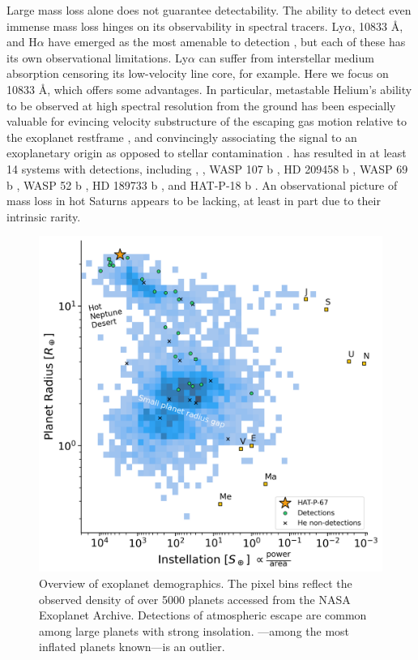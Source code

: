 \documentclass[twocolumn]{aastex631}
\newcommand{\hatpb}{\object{HAT-P-67 b}}
\begin{document}
Large mass loss alone does not guarantee detectability.  The ability to detect even immense mass loss hinges on its observability in spectral tracers.  Ly$\alpha$,  10833 \AA, and H$\alpha$ have emerged as the most amenable to detection \citep{2018ApJ...855L..11O,2022arXiv221116243D,2023MNRAS.518.4357O}, but each of these has its own observational limitations.  Ly$\alpha$ can suffer from interstellar medium  absorption censoring its low-velocity line core, for example.  Here we focus on  10833 \AA, which offers some advantages.  In particular, metastable Helium's ability to be observed at high spectral resolution from the ground has been especially valuable for evincing velocity substructure of the escaping gas motion relative to the exoplanet restframe \citep{2019A&A...629A.110A,2020ApJ...894...97N}, and convincingly associating the signal to an exoplanetary origin as opposed to stellar contamination \citep{2018AJ....156..189C}.   has resulted in at least 14 systems with detections, including  \citep{2020ApJ...894...97N, 2021A&A...647A.129L},  \citep{2022AJ....163...68Z}, WASP 107 b \citep{2019A&A...623A..58A,2020AJ....159..115K}, HD 209458 b \citep{2019A&A...629A.110A}, WASP 69 b \citep{2020AJ....159..278V}, WASP 52 b \citep{2020AJ....159..278V}, HD 189733 b \citep{2021A&A...647A.129L}, and HAT-P-18 b \citep{2021ApJ...909L..10P}.  An observational picture of mass loss in hot Saturns appears to be lacking, at least in part due to their intrinsic rarity.

\begin{figure}
    \centering
    \includegraphics[width=\linewidth]{figures/HAT-P-67b_radius_valley.png}
    \caption{Overview of exoplanet demographics.  The pixel bins reflect the observed density of over 5000 planets accessed from the NASA Exoplanet Archive. Detections of atmospheric escape are common among large planets with strong insolation.  \hatpb---among the most inflated planets known---is an outlier.}
    \label{fig:instellation}
\end{figure}
\end{document}
